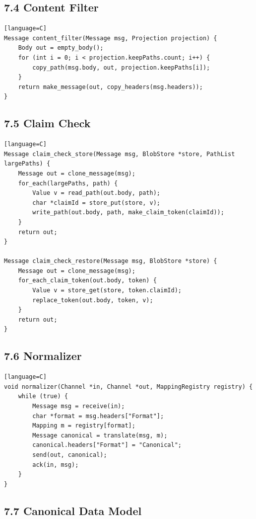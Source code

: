 \documentclass[11pt]{article}
\begin{document}
\subsection{7.4 Content Filter}\label{content-filter}

\begin{verbatim}[language=C]
Message content_filter(Message msg, Projection projection) {
    Body out = empty_body();
    for (int i = 0; i < projection.keepPaths.count; i++) {
        copy_path(msg.body, out, projection.keepPaths[i]);
    }
    return make_message(out, copy_headers(msg.headers));
}
\end{verbatim}

\subsection{7.5 Claim Check}\label{claim-check}

\begin{verbatim}[language=C]
Message claim_check_store(Message msg, BlobStore *store, PathList largePaths) {
    Message out = clone_message(msg);
    for_each(largePaths, path) {
        Value v = read_path(out.body, path);
        char *claimId = store_put(store, v);
        write_path(out.body, path, make_claim_token(claimId));
    }
    return out;
}

Message claim_check_restore(Message msg, BlobStore *store) {
    Message out = clone_message(msg);
    for_each_claim_token(out.body, token) {
        Value v = store_get(store, token.claimId);
        replace_token(out.body, token, v);
    }
    return out;
}
\end{verbatim}

\subsection{7.6 Normalizer}\label{normalizer}

\begin{verbatim}[language=C]
void normalizer(Channel *in, Channel *out, MappingRegistry registry) {
    while (true) {
        Message msg = receive(in);
        char *format = msg.headers["Format"];
        Mapping m = registry[format];
        Message canonical = translate(msg, m);
        canonical.headers["Format"] = "Canonical";
        send(out, canonical);
        ack(in, msg);
    }
}
\end{verbatim}

\subsection{7.7 Canonical Data Model}\label{canonical-data-model}
\end{document}
